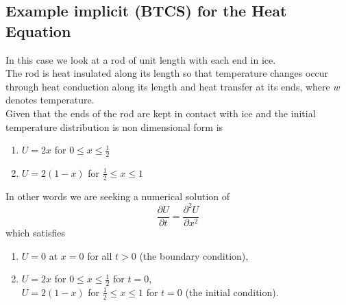 \subsection{Example implicit (BTCS) for the Heat Equation} 
In this case we look at a rod of unit length with each end in ice.\\
The rod is heat insulated along its length so that temperature changes occur through
heat conduction along its length and heat transfer at its ends, where $w$ denotes
temperature.\\
Given that the ends of the rod are kept in contact with ice and the initial temperature
distribution is non dimensional form is
\begin{enumerate}
\item $U=2x$ for $0\leq x \leq \frac{1}{2}$ 
\item $U=2(1-x)$ for $\frac{1}{2}\leq x \leq 1$ 
\end{enumerate}
In other words we are seeking a numerical solution of
\[\frac{\partial U}{\partial t}=\frac{\partial^2U }{\partial x^2}\]
which satisfies
\begin{enumerate}
\item $U=0$ at $x=0$ for all $t>0$ (the boundary condition),
\item $U=2x$ for $0\leq x \leq \frac{1}{2}$ for $t=0$,\\
$U=2(1-x)$ for $\frac{1}{2}\leq x \leq 1$ for $t=0$ (the initial condition).
\end{enumerate}
